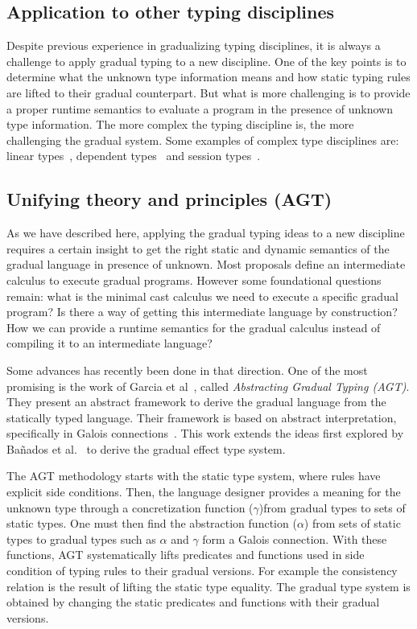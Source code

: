 \documentclass{article}
\begin{document}
\subsection{Application to other typing disciplines}
Despite previous experience in gradualizing typing disciplines, it is always a challenge to apply gradual typing to a new discipline. One of the key points is to determine what the unknown type information means and how static typing rules are lifted to their gradual counterpart. But what is more challenging is to provide a proper runtime semantics to evaluate a program in the presence of unknown type information. The more complex the typing discipline is, the more challenging the gradual system. Some examples of complex type disciplines are: linear types~\cite{pierce:atapl}, dependent types~\cite{pierce:atapl} and session types~\cite{dezaniCiancaglini:WSFM2009}.

\subsection{Unifying theory and principles (AGT)}\label{sec:agt}
As we have described here, applying the gradual typing ideas to a new discipline requires a certain insight to get the right static and dynamic semantics of the gradual language in presence of unknown. Most proposals define an intermediate calculus to execute gradual programs. However some foundational questions remain: what is the minimal cast calculus we need to execute a specific gradual program? Is there a way of getting this intermediate language by construction? How we can provide a runtime semantics for the gradual calculus instead of compiling it to an intermediate language?

Some advances has recently been done  in that direction. One of the most promising is the work of Garcia et al~\cite{garciaAl:popl2016}, called \emph{Abstracting Gradual Typing (AGT)}. They present an abstract framework to derive the gradual language from the statically typed language. Their framework is based on abstract interpretation, specifically in Galois connections~\cite{cousot:popl1977}. This work extends the ideas first explored by Ba{\~n}ados et al.~\cite{banadosAl:icfp2014} to derive the gradual effect type system.

The AGT methodology starts with the static type system, where rules have explicit side conditions. Then, the language designer provides a meaning for the unknown type through a concretization function ($\gamma$)from gradual types to sets of static types. One must then find the abstraction function ($\alpha$) from sets of static types to gradual types such as $\alpha$ and $\gamma$ form a Galois connection. With these functions, AGT systematically lifts predicates and functions used in side condition of typing rules to their gradual versions. For example the consistency relation is the result of lifting the static type equality. The gradual type system is obtained by changing the static predicates and functions with their gradual versions. 
\end{document}
